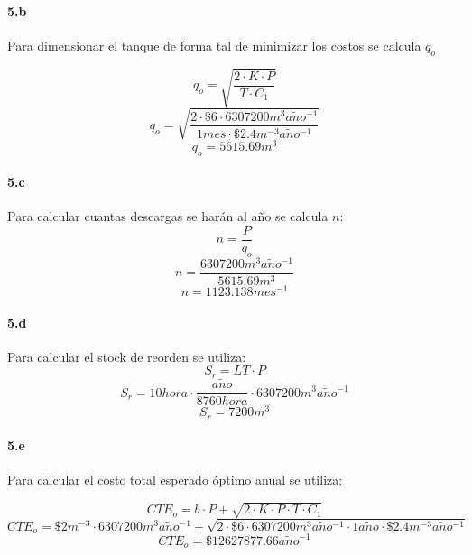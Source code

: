\documentclass{article}
\def \anio {a\tilde{n}o}
\begin{document}
  \paragraph{5.b}
  Para dimensionar el tanque de forma tal de minimizar los costos se calcula $q_o$
  
  $$q_o = \sqrt{\frac{2 \cdot K \cdot P}{T \cdot C_1}}$$
  $$q_o = \sqrt{\frac{2 \cdot \$6 \cdot 6307200 m^3 \anio^{-1}}{1 mes \cdot \$2.4 m^{-3}\anio^{-1}}} $$
  $$\boxed{q_o = 5615.69 m^3} $$

  \paragraph{5.c}
  Para calcular cuantas descargas se har\'an al a\~no se calcula $n$:
  $$n = \frac{P}{q_o} $$
  $$n = \frac{6307200 m^3 \anio^{-1}}{5615.69 m^3} $$
  $$\boxed{n = 1123.138 mes^{-1}} $$

  \paragraph{5.d}
  Para calcular el stock de reorden se utiliza:
  $$S_r = LT \cdot P $$
  $$S_r = 10 hora \cdot \frac{\anio}{8760 hora} \cdot  6307200 m^3 \anio^{-1} $$
  $$\boxed{S_r = 7200 m^3 }$$
  
  \paragraph{5.e}
  Para calcular el costo total esperado \'optimo anual se utiliza:

  $$CTE_o = b \cdot P + \sqrt{2 \cdot K \cdot P \cdot T \cdot C_1} $$
  $$CTE_o = \$2 m^{-3} \cdot 6307200 m^3 \anio^{-1} + \sqrt{2 \cdot \$6 \cdot 6307200 m^3 \anio^{-1} \cdot 1 \anio \cdot \$2.4 m^{-3}\anio^{-1} }$$
  $$\boxed{CTE_o = \$12627877.66 \anio^{-1}} $$



\pagebreak
\end{document}
